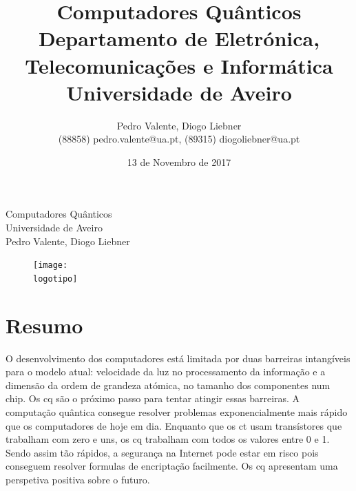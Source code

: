 \documentclass{report}
\begin{document}
%
\def\titulo{Computadores Quânticos}
\def\data{13 de Novembro de 2017}
\def\autores{Pedro Valente, Diogo Liebner}
\def\autorescontactos{(88858) pedro.valente@ua.pt, (89315) diogoliebner@ua.pt}
\def\versao{Versão 1}
\def\departamento{Departamento de Eletrónica, Telecomunicações e Informática}
\def\empresa{Universidade de Aveiro}
\def\logotipo{ua.pdf}
%
%
\begin{titlepage}

\begin{center}
%
\vspace*{50mm}
%
{\Huge \titulo}\\ 
%
\vspace{10mm}
%
{\Large \empresa}\\
%
\vspace{10mm}
%
{\LARGE \autores}\\ 
%
\vspace{30mm}
%
\begin{figure}[h]
	\center
	\texttt{[image: \\logotipo]}
\end{figure}
%
\vspace{30mm}
\end{center}
%
\begin{flushright}

\end{flushright}
\end{titlepage}

\null
{}
\title{%
{\Huge\textbf{\titulo}}\\
{\Large \departamento\\ \empresa}
}
%
\author{%
    \autores \\
    \autorescontactos
}
%
\date{\data}
%
\maketitle

\clearpage
\null


\tableofcontents



\chapter{Resumo}
	O desenvolvimento dos computadores está limitada por duas barreiras intangíveis para o modelo atual: velocidade da luz no processamento da informação e a dimensão da ordem de grandeza atómica, no tamanho dos componentes num chip. Os \ac{cq} são o próximo passo para tentar atingir essas barreiras. A computação quântica  consegue resolver problemas exponencialmente mais rápido que os computadores de hoje em dia. Enquanto que os \ac{ct} usam transístores que trabalham com zero e uns, os \ac{cq} trabalham com todos os valores entre 0 e 1. Sendo assim tão rápidos, a segurança na Internet pode estar em risco pois conseguem resolver formulas de encriptação facilmente. Os \ac{cq} apresentam uma perspetiva positiva sobre o futuro.
\end{document}
